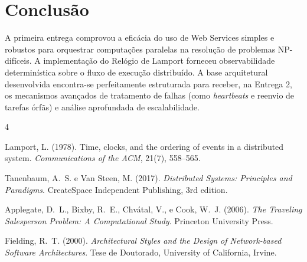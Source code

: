 \documentclass[12pt]{article}
\begin{document}
\section{Conclusão}
A primeira entrega comprovou a eficácia do uso de Web Services simples e robustos para orquestrar computações paralelas na resolução de problemas NP-difíceis. A implementação do Relógio de Lamport forneceu observabilidade determinística sobre o fluxo de execução distribuído. A base arquitetural desenvolvida encontra-se perfeitamente estruturada para receber, na Entrega 2, os mecanismos avançados de tratamento de falhas (como \textit{heartbeats} e reenvio de tarefas órfãs) e análise aprofundada de escalabilidade.

\begin{thebibliography}{4}

Lamport, L. (1978).
Time, clocks, and the ordering of events in a distributed system.
\textit{Communications of the ACM}, 21(7), 558--565.

Tanenbaum, A.~S. e Van Steen, M. (2017).
\textit{Distributed Systems: Principles and Paradigms}.
CreateSpace Independent Publishing, 3rd edition.

Applegate, D.~L., Bixby, R.~E., Chv{\'a}tal, V., e Cook, W.~J. (2006).
\textit{The Traveling Salesperson Problem: A Computational Study}.
Princeton University Press.

Fielding, R.~T. (2000).
\textit{Architectural Styles and the Design of Network-based Software Architectures}.
Tese de Doutorado, University of California, Irvine.

\end{thebibliography}
\end{document}
